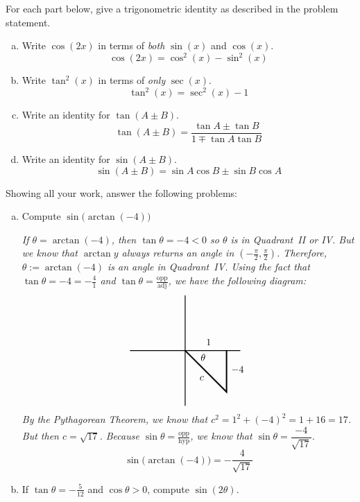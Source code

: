 \documentclass[12pt,letterpaper]{exam}
\begin{document}
\begin{questions}
\newpage
\question[10] For each part below, give a trigonometric identity as described in the problem statement.
	\begin{enumerate}[(a)]
	\item Write $\cos(2x)$ in terms of \textit{both} $\sin(x)$ and $\cos(x)$. \vfill
		\[
		\cos(2x)= \cos^2(x) - \sin^2(x)
		\] \vfill
	\item Write $\tan^2(x)$ in terms of \textit{only} $\sec(x)$. \vfill
		\[
		\tan^2(x)= \sec^2(x) - 1
		\] \vfill
	\item Write an identity for $\tan(A \pm B)$. \vfill
		\[
		\tan(A \pm B)= \dfrac{\tan A \pm \tan B}{1 \mp \tan A \tan B}
		\] \vfill
	\item Write an identity for $\sin(A \pm B)$. \vfill
		\[
		\sin(A \pm B)= \sin A \cos B \pm \sin B \cos A
		\] \vfill
	\end{enumerate}



\newpage
\question[20] Showing all your work, answer the following problems: \par\vspace{0.1cm}
	\begin{enumerate}[(a)]
	\item Compute $\sin \!\big( \!\arctan(-4) \big)$ 

	{\itshape If $\theta= \arctan(-4)$, then $\tan \theta= -4 < 0$ so $\theta$ is in Quadrant~II or IV. But we know that $\arctan y$ always returns an angle in $(-\frac{\pi}{2}, \frac{\pi}{2})$. Therefore, $\theta:= \arctan(-4)$ is an angle in Quadrant~IV. Using the fact that $\tan \theta= -4= -\frac{4}{1}$ and $\tan \theta= \frac{\text{opp}}{\text{adj}}$, we have the following diagram:
		\[
		\begin{tikzpicture}
		\draw[line width=0.03cm] (-2,0) -- (2,0);
		\draw[line width=0.03cm] (0,-2) -- (0,2);
		\draw[line width=0.05cm] (0,0) -- (1.5,-1.5) -- (1.5,0);
		\node at (0.65,-0.25) {$\theta$};
		\node at (0.85,0.3) {$1$};
		\node at (1.9,-0.7) {$-4$};
		\node at (0.6,-1.0) {$c$};
		\end{tikzpicture}
		\]
	By the Pythagorean Theorem, we know that $c^2= 1^2 + (-4)^2= 1 + 16= 17$. But then $c= \sqrt{17}$. Because $\sin \theta= \frac{\text{opp}}{\text{hyp}}$, we know that $\sin \theta= \dfrac{-4}{\sqrt{17}}$.
		\[
		\boxed{\sin \!\big(\!\arctan(-4) \big)= -\dfrac{4}{\sqrt{17}}}
		\]
	}
	
	\item If $\tan \theta= -\frac{5}{12}$ and $\cos \theta > 0$, compute $\sin(2 \theta)$. \par\vspace{0.1cm}
	

\end{enumerate}
\end{questions}
\end{document}
